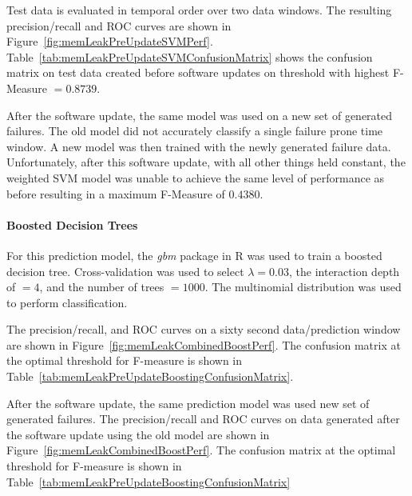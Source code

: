 Test data is evaluated in temporal order over two data windows.  The resulting
precision/recall and \ac{ROC} curves are shown in
Figure~\ref{fig:memLeakPreUpdateSVMPerf}.
Table~\ref{tab:memLeakPreUpdateSVMConfusionMatrix} shows the confusion matrix
on test data created before software updates on threshold with highest
F-Measure $= 0.8739$.

\figMemLeakPreUpdateSVMPerf
\tabMemLeakPreUpdateSVMConfusionMatrix

After the software update, the same model was used on a new set of generated
failures.  The old model did not accurately classify a single failure prone
time window.  A new model was then trained with the newly generated failure
data.  Unfortunately, after this software update, with all other things held
constant, the weighted SVM model was unable to achieve the same level of
performance as before resulting in a maximum F-Measure of $0.4380$.

\paragraph{Boosted Decision Trees}
For this prediction model, the \emph{gbm} package in R was used to train a
boosted decision tree.  Cross-validation was used to select $\lambda = 0.03$,
the interaction depth of $= 4$, and the number of trees $= 1000$.  The
multinomial distribution was used to perform classification.

The precision/recall, and \ac{ROC} curves on a sixty second data/prediction
window are shown in Figure~\ref{fig:memLeakCombinedBoostPerf}.  The
confusion matrix at the optimal threshold for F-measure is shown in
Table~\ref{tab:memLeakPreUpdateBoostingConfusionMatrix}.

\figMemLeakCombinedBoostPerf
\tabMemLeakPreUpdateBoostingConfusionMatrix

After the software update, the same prediction model was used new set of
generated failures.  The precision/recall and \ac{ROC} curves on data generated
after the software update using the old model are shown in
Figure~\ref{fig:memLeakCombinedBoostPerf}.  The confusion matrix at
the optimal threshold for F-measure is shown in
Table~\ref{tab:memLeakPreUpdateBoostingConfusionMatrix}

\tabMemLeakPostUpdateBoostingSameModelConfusionMatrix

